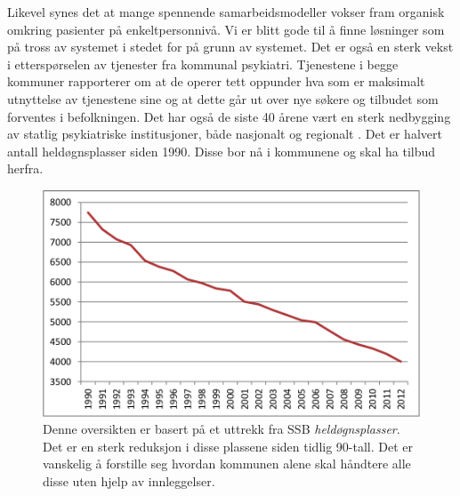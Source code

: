 \documentclass[11pt]{report} %
\begin{document}
                  Likevel synes det at mange spennende samarbeidsmodeller vokser fram organisk omkring pasienter på enkeltpersonnivå. Vi er blitt gode til å finne løsninger som på tross av systemet i stedet for på grunn av systemet.
                  Det er også en sterk vekst i etterspørselen av tjenester fra kommunal psykiatri. Tjenestene i begge kommuner rapporterer om at de operer tett oppunder hva som er maksimalt utnyttelse av tjenestene sine og at dette går ut over nye søkere og tilbudet som forventes i befolkningen.
                  Det har også de siste 40 årene vært en sterk nedbygging av statlig psykiatriske institusjoner, både nasjonalt og regionalt
                  \cite{SSButtrekk1}. Det er halvert antall heldøgnsplasser siden 1990. Disse bor nå i kommunene og skal ha tilbud herfra. 

                \begin{figure}[ht]
                  \centering
                  \includegraphics{./pix/heldgnpsykplass}
                  \caption[Oversikt over reduksjon i  \textit{heldøgnsplasser}.]
                   {Denne oversikten er basert på et uttrekk fra SSB \textit{heldøgnsplasser}. Det er en sterk reduksjon i disse plassene siden tidlig 90-tall. Det er vanskelig å forstille seg hvordan kommunen alene skal håndtere alle disse uten hjelp av innleggelser.}
                \end{figure}  
\end{document}
